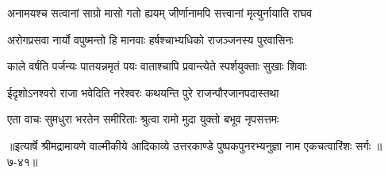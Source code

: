 \twolineshloka
{अनामयश्च सत्वानां साग्रो मासो गतो ह्ययम्}
{जीर्णानामपि सत्त्वानां मृत्युर्नायाति राघव} %

\twolineshloka
{अरोगप्रसवा नार्यो वपुष्मन्तो हि मानवाः}
{हर्षश्चाभ्यधिको राजञ्जनस्य पुरवासिनः} %

\twolineshloka
{काले वर्षति पर्जन्यः पातयन्नमृतं पयः}
{वाताश्चापि प्रवान्त्येते स्पर्शयुक्ताः सुखाः शिवाः} %

\twolineshloka
{ईदृशोऽनश्वरो राजा भवेदिति नरेश्वरः}
{कथयन्ति पुरे राजन्पौरजानपदास्तथा} %

\twolineshloka
{एता वाचः सुमधुरा भरतेन समीरिताः}
{श्रुत्वा रामो मुदा युक्तो बभूव नृपसत्तमः} %


॥इत्यार्षे श्रीमद्रामायणे वाल्मीकीये आदिकाव्ये उत्तरकाण्डे पुष्पकपुनरभ्यनुज्ञा नाम एकचत्वारिंशः सर्गः ॥७-४१॥
